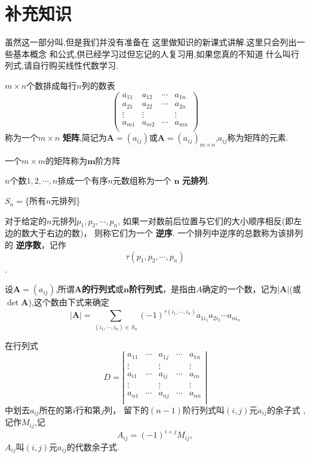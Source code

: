 \section{补充知识}

虽然这一部分叫,但是我们并没有准备在
这里做知识的新课式讲解.这里只会列出一些基本概念
和公式,供已经学习过但忘记的人复习用,如果您真的不知道
什么叫行列式,请自行购买线性代数学习.

 $m\times n$个数排成每行$n$列的数表
$$\left(
  \begin{array}{cccc}
    a_{11} & a_{12} & \cdots & a_{1n} \\
    a_{21} & a_{22} & \cdots & a_{2n} \\
    \vdots & \vdots &  & \vdots \\
    a_{m1} & a_{m2} & \cdots & a_{mn} \\
  \end{array}
\right)$$
称为一个$m\times n$ \textbf{矩阵},简记为$\bm{A}=(a_{ij})$或$\bm{A}=(a_{ij})_{m\times n}$,$a_{ij}$称为矩阵的元素.

 一个$m\times m$的矩阵称为$\bm{m}$阶方阵

 $n$个数$1,2,\cdots,n$排成一个有序$n$元数组称为一个 $\bm{n}$ \textbf{元排列}.

 $S_n=$\{所有$n$元排列\}

 对于给定的$n$元排列$p_1,p_2,\cdots,p_n$,
如果一对数前后位置与它们的大小顺序相反(即左边的数大于右边的数)，
则称它们为一个 \textbf{逆序}.
一个排列中逆序的总数称为该排列的 \textbf{逆序数}，记作$$\tau(p_1,p_2,\cdots,p_n)$$.

 设$\bm{A}=(a_{ij})$,所谓$\bm{A}$\textbf{的行列式}或$\bm{n}$\textbf{阶行列式}，是指由$A$确定的一个数，记为$\left | \bm{A} \right |$(或$\det \bm{A}$),这个数由下式来确定
$$
\left | \bm{A} \right |=\sum_{(i_1,\cdots,i_n)\in S_n}{(-1)^{\tau(i_1,\cdots,i_n)}a_{1i_1}a_{2i_2}\cdots a_{ni_n}}
$$

 在行列式
$$
D=
\left|
  \begin{array}{ccccc}
    a_{11} & \cdots & a_{1j} & \cdots & a_{1n} \\
    \vdots &  & \vdots &  & \vdots \\
    a_{i1} & \cdots & a_{ij} & \cdots & a_{in} \\
    \vdots &  & \vdots &  & \vdots \\
    a_{n1} & \cdots & a_{nj} & \cdots & a_{nn} \\
  \end{array}
\right|
$$
中划去$a_{ij}$所在的第$i$行和第$j$列，
留下的$(n-1)$阶行列式叫$(i,j)$元$a_{ij}$的余子式
,记作$M_{ij}$,记$$A_{ij}=(-1)^{i+j}M_{ij},$$
$A_{ij}$叫$(i,j)$元$a_{ij}$的代数余子式.

